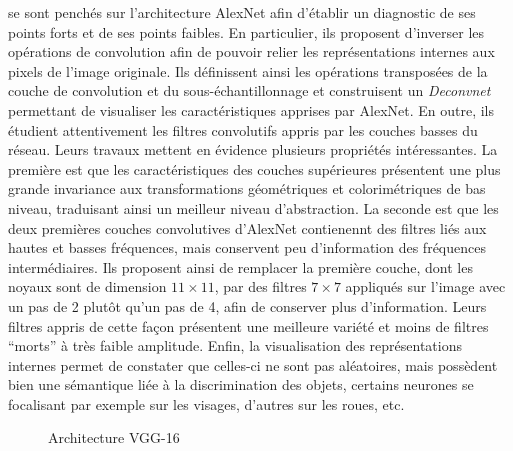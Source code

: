 \citet{zeiler_visualizing_2014-1} se sont penchés sur l'architecture AlexNet afin d'établir un diagnostic de ses points forts et de ses points faibles. En particulier, ils proposent d'inverser les opérations de convolution afin de pouvoir relier les représentations internes aux pixels de l'image originale. Ils définissent ainsi les opérations transposées de la couche de convolution et du sous-échantillonnage et construisent un \emph{Deconvnet} permettant de visualiser les caractéristiques apprises par AlexNet. En outre, ils étudient attentivement les filtres convolutifs appris par les couches basses du réseau. Leurs travaux mettent en évidence plusieurs propriétés intéressantes. La première est que les caractéristiques des couches supérieures présentent une plus grande invariance aux transformations géométriques et colorimétriques de bas niveau, traduisant ainsi un meilleur niveau d'abstraction. La seconde est que les deux premières couches convolutives d'AlexNet contienennt des filtres liés aux hautes et basses fréquences, mais conservent peu d'information des fréquences intermédiaires. Ils proposent ainsi de remplacer la première couche, dont les noyaux sont de dimension $11\times11$, par des filtres $7\times7$ appliqués sur l'image avec un pas de 2 plutôt qu'un pas de 4, afin de conserver plus d'information. Leurs filtres appris de cette façon présentent une meilleure variété et moins de filtres ``morts'' à très faible amplitude. Enfin, la visualisation des représentations internes permet de constater que celles-ci ne sont pas aléatoires, mais possèdent bien une sémantique liée à la discrimination des objets, certains neurones se focalisant par exemple sur les visages, d'autres sur les roues, etc.

\begin{figure}[t]
  \resizebox{\textwidth}{!}{
    
  }
  \caption{Architecture VGG-16~\cite{simonyan_very_2014}}
  \label{fig:vgg}
\end{figure}

